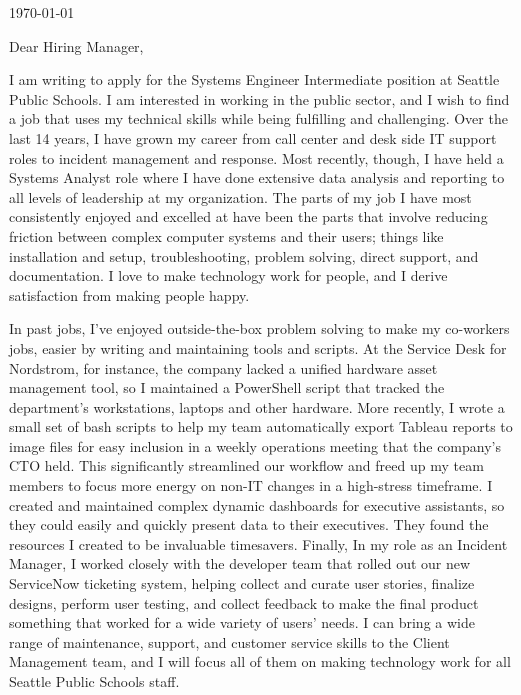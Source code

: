\documentclass[10pt,oneside]{article}
\begin{document}
\hfill\dte\today
\heading
\vspace{\baselineskip}
\vspace{\baselineskip}

Dear Hiring Manager,

\vspace{\baselineskip}

I am writing to apply for the Systems Engineer Intermediate position at Seattle Public Schools. I am interested in working in the public sector, and I wish to find a job that uses my technical skills while being fulfilling and challenging. Over the last 14 years, I have grown my career from call center and desk side IT support roles to incident management and response. Most recently, though, I have held a Systems Analyst role where I have done extensive data analysis and reporting to all levels of leadership at my organization. The parts of my job I have most consistently enjoyed and excelled at have been the parts that involve reducing friction between complex computer systems and their users; things like installation and setup, troubleshooting, problem solving, direct support, and documentation. I love to make technology work for people, and I derive satisfaction from making people happy.

\vspace{\baselineskip}

In past jobs, I’ve enjoyed outside-the-box problem solving to make my co-workers jobs, easier by writing and maintaining tools and scripts. At the Service Desk for Nordstrom, for instance, the company lacked a unified hardware asset management tool, so I maintained a PowerShell script that tracked the department’s workstations, laptops and other hardware. More recently, I wrote a small set of bash scripts to help my team automatically export Tableau reports to image files for easy inclusion in a weekly operations meeting that the company’s CTO held. This significantly streamlined our workflow and freed up my team members to focus more energy on non-IT changes in a high-stress timeframe. I created and maintained complex dynamic dashboards for executive assistants, so they could easily and quickly present data to their executives. They found the resources I created to be invaluable timesavers. Finally, In my role as an Incident Manager, I worked closely with the developer team that rolled out our new ServiceNow ticketing system, helping collect and curate user stories, finalize designs, perform user testing, and collect feedback to make the final product something that worked for a wide variety of users' needs. I can bring a wide range of maintenance, support, and customer service skills to the Client Management team, and I will focus all of them on making technology work for all Seattle Public Schools staff.
\end{document}
